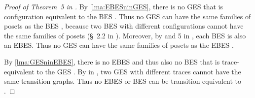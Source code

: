 \documentclass[runningheads,a4paper]{llncs}
\begin{document}
\begin{proof}[Proof of Theorem~5 in \cite{dynamicCausality15}]
	By \lem\ref{lma:EBESninGES}, there is no GES that is configuration equivalent
	to the BES . Thus no GES can have the same families of posets
	as the BES , because two BES with different configurations
	cannot have the same families of posets (\cf \S~2.2 in \cite{dynamicCausality15}). Moreover, by  and 5 in \cite{dynamicCausality15}, each BES is also an EBES. Thus no GES can have the same families of posets as the EBES .
	
	By \lem\ref{lma:GESninEBES}, there is no EBES and thus also no BES that is trace-equivalent to the GES . By  in \cite{dynamicCausality15}, two GES with different traces cannot have the same transition graphs. Thus no EBES or BES can be transition-equivalent to .
\end{proof}
\end{document}
